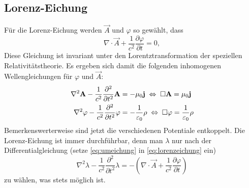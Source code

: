 \subsection{Lorenz-Eichung}

Für die Lorenz-Eichung werden $\vec {A}$ und $\varphi $ so gewählt, dass
\begin{equation}
	\label{eq:lorenzeichung}
	\nabla \cdot \vec {A}+\frac{1}{c^{2}}\frac{\partial \varphi }{\partial t}=0,
\end{equation}
Diese Gleichung ist invariant unter den Lorentztransformation der speziellen Relativitätstheorie. Es ergeben sich damit die folgenden inhomogenen Wellengleichungen für $\varphi $ und $\vec {A}$:
\begin{align*}
	\nabla ^{2}\mathbf{A}-\frac{1}{c^{2}}\frac{\partial ^{2}}{\partial t^{2}}\mathbf{A} & =-\mu _{0}\mathbf{j}\;\Leftrightarrow\; \Box \mathbf{A}=\mu _{0}\mathbf{j}                              \\
	\nabla ^{2}\varphi -\frac{1}{c^{2}}\frac{\partial ^{2}}{\partial t^{2}}\varphi  & =-\frac{1}{\varepsilon _{0}}\rho \;\Leftrightarrow\; \Box \varphi =\frac{1}{\varepsilon _{0}}\rho
\end{align*}
Bemerkenswerterweise sind jetzt die verschiedenen Potentiale entkoppelt. Die Lorenz-Eichung ist immer durchführbar, denn man $\lambda $ nur nach der Differentialgleichung (setze \eqref{eq:umeichung} in \eqref{eq:lorenzeichung} ein)
\begin{equation*}
	\nabla ^{2}\lambda -\frac{1}{c^{2}}\frac{\partial ^{2}}{\partial t^{2}}\lambda =-\left(\nabla \cdot \vec {A}+\frac{1}{c^{2}}\frac{\partial \varphi }{\partial t}\right)
\end{equation*}
zu wählen, was stets möglich ist.

